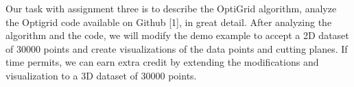 Our task with assignment three is to describe the OptiGrid algorithm, analyze the Optigrid code available on Github [1], in great detail. 
After analyzing the algorithm and the code, we will modify the demo example to accept a 2D dataset of 30000 points and create visualizations of the data points and cutting planes. 
If time permits, we can earn extra credit by extending the modifications and visualization to a 3D dataset of 30000 points.